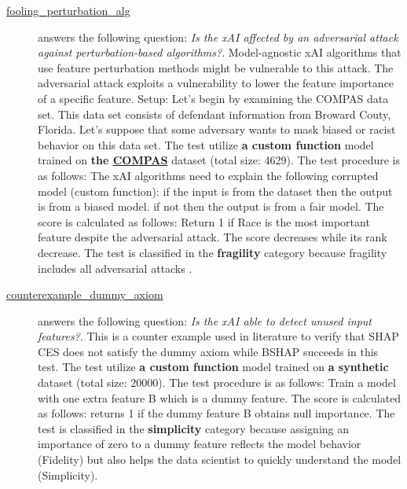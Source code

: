 \begin{description}
\item[\href{Compare-xAI/tree/main/tests/fooling_perturbation_alg.py}{fooling\_perturbation\_alg}] answers the following question: \emph{Is the xAI affected by an adversarial attack against perturbation-based algorithms?}.
Model-agnostic xAI algorithms that use feature perturbation methods might be vulnerable to this attack. The adversarial attack exploits a vulnerability to lower the feature importance of a specific feature. Setup: Let's begin by examining the COMPAS data set. This data set consists of defendant information from Broward Couty, Florida. Let's suppose that some adversary wants to mask biased or racist behavior on this data set.
 The test utilize \textbf{a custom function} model trained on \textbf{the \href{https://github.com/propublica/compas-analysis/blob/master/compas-scores-two-years.csv}{COMPAS}} dataset (total size: 4629).
 The test procedure is as follows: The xAI algorithms need to explain the following corrupted model (custom function): if the input is from the dataset then the output is from a biased model. if not then the output is from a fair model.
 The score is calculated as follows: Return 1 if Race is the most important feature despite the adversarial attack. The score decreases while its rank decrease.
 The test is classified in the \textbf{fragility} category because fragility includes all adversarial attacks \citep{ghorbani2019interpretation}.


\item[\href{Compare-xAI/tree/main/tests/dummy_axiom.py}{counterexample\_dummy\_axiom}] answers the following question: \emph{Is the xAI able to detect unused input features?}.
This is a counter example used in literature to verify that SHAP CES does not satisfy the dummy axiom while BSHAP succeeds in this test.
 The test utilize \textbf{a custom function} model trained on \textbf{a synthetic} dataset (total size: 20000).
 The test procedure is as follows: Train a model with one extra feature B which is a dummy feature.
 The score is calculated as follows: returns 1 if the dummy feature B obtains null importance.
 The test is classified in the \textbf{simplicity} category because assigning an importance of zero to a dummy feature reflects the model behavior (Fidelity) but also helps the data scientist to quickly understand the model (Simplicity).



\end{description}
